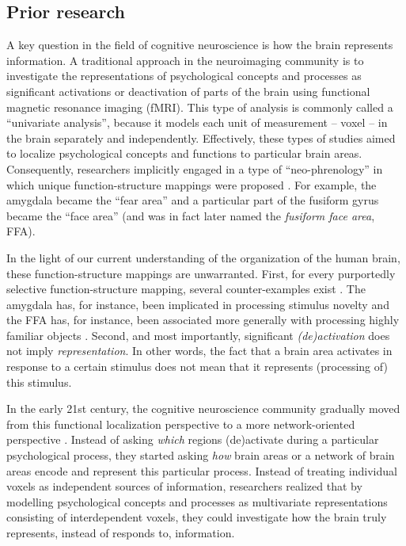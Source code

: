 \documentclass[12pt,a4paper]{article}\usepackage[]{graphicx}\usepackage[]{color}
\begin{document}
\subsection{Prior research}
A key question in the field of cognitive neuroscience is how the brain represents information. A traditional approach in the neuroimaging community is to investigate the representations of psychological concepts and processes as significant activations or deactivation of parts of the brain using functional magnetic resonance imaging (fMRI). This type of analysis is commonly called a ``univariate analysis'', because it models each unit of measurement -- voxel -- in the brain separately and independently. Effectively, these types of studies aimed to localize psychological concepts and functions to particular brain areas. Consequently, researchers implicitly engaged in a type of ``neo-phrenology'' in which unique function-structure mappings were proposed \citep{poldrack2010}. For example, the amygdala became the ``fear area'' \citep{ledoux2003} and a particular part of the fusiform gyrus became the ``face area'' (and was in fact later named the \emph{fusiform face area}, FFA).  

In the light of our current understanding of the organization of the human brain, these function-structure mappings are unwarranted. First, for every purportedly selective function-structure mapping, several counter-examples exist \citep{poldrack2010}. The amygdala has, for instance, been implicated in processing stimulus novelty \citep{blackford2010} and the FFA has, for instance, been associated more generally with processing highly familiar objects \citep{tarr2000}. Second, and most importantly, significant \emph{(de)activation} does not imply \emph{representation}. In other words, the fact that a brain area activates in response to a certain stimulus does not mean that it represents (processing of) this stimulus.   

In the early 21st century, the cognitive neuroscience community gradually moved from this functional localization perspective to a more network-oriented perspective \citep{sporns2002,barrett2013}. Instead of asking \emph{which} regions (de)activate during a particular psychological process, they started asking \emph{how} brain areas or a network of brain areas encode and represent this particular process. Instead of treating individual voxels as independent sources of information, researchers realized that by modelling psychological concepts and processes as multivariate representations consisting of interdependent voxels, they could investigate how the brain truly represents, instead of responds to, information.
\end{document}
